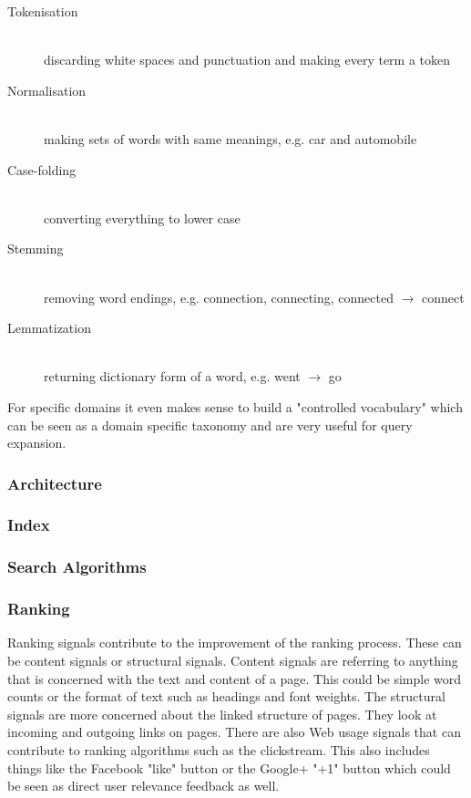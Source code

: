 \begin{description}
  \item [Tokenisation] \hfill \\
  discarding white spaces and punctuation and making every term a token
  \item [Normalisation] \hfill \\
  making sets of words with same meanings, e.g. car and automobile
  \item [Case-folding] \hfill \\
  converting everything to lower case
  \item [Stemming] \hfill \\
  removing word endings, e.g. connection, connecting, connected $\to$ connect
  \item [Lemmatization] \hfill \\
  returning dictionary form of a word, e.g. went $\to$ go
\end{description}

For specific domains it even makes sense to build a "controlled vocabulary" which can be seen as a domain specific taxonomy and are very useful for query expansion.

\subsubsection{Architecture}
\subsubsection{Index}
\subsubsection{Search Algorithms}
\subsubsection{Ranking}

Ranking signals contribute to the improvement of the ranking process. These can be content signals or structural signals. Content signals are referring to anything that is concerned with the text and content of a page. This could be simple word counts or the format of text such as headings and font weights. The structural signals are more concerned about the linked structure of pages. They look at incoming and outgoing links on pages. There are also Web usage signals that can contribute to ranking algorithms such as the clickstream.  This also includes things like the Facebook "like" button or the Google+ "+1" button which could be seen as direct user relevance feedback as well.

